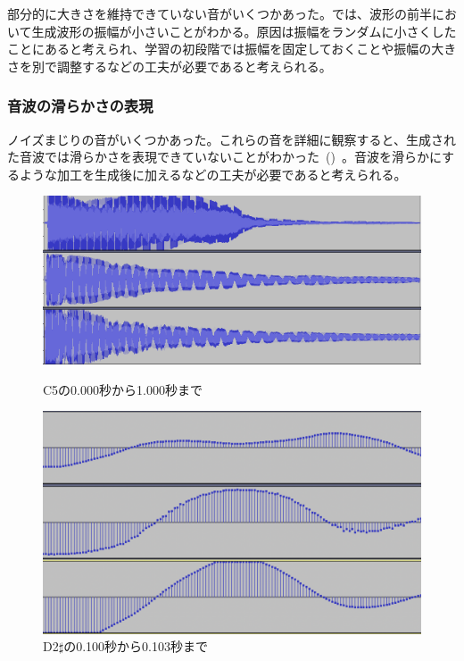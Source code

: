 部分的に大きさを維持できていない音がいくつかあった。では、波形の前半において生成波形の振幅が小さいことがわかる。原因は振幅をランダムに小さくしたことにあると考えられ、学習の初段階では振幅を固定しておくことや振幅の大きさを別で調整するなどの工夫が必要であると考えられる。
    
\subsubsection{音波の滑らかさの表現}

ノイズまじりの音がいくつかあった。これらの音を詳細に観察すると、生成された音波では滑らかさを表現できていないことがわかった~()~。音波を滑らかにするような加工を生成後に加えるなどの工夫が必要であると考えられる。

\begin{figure}[b]
\centering
\begin{minipage}{0.48\columnwidth}
\centering
\includegraphics[width=0.85\columnwidth]{figure/88_88/c5.png}
\caption[C5の音波]{C5の0.000秒から1.000秒まで}
\label{fig:88_88_amp}
\end{minipage}
\begin{minipage}{0.48\columnwidth}
\centering
\includegraphics[width=0.75\columnwidth]{figure/88_88_det/d2s_0100_0103.png}
\caption[D2$\sharp$の音波]{D2$\sharp$の0.100秒から0.103秒まで}
\label{fig:88_88_smooth}
\end{minipage}
\end{figure}

